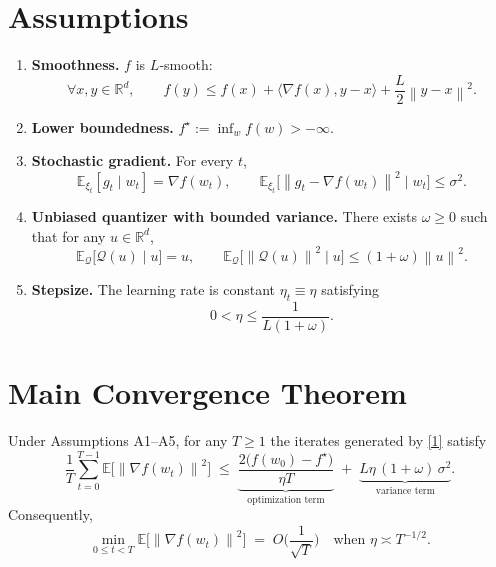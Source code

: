 \documentclass{article}
\newcommand{\E}{\mathbb{E}}
\newcommand{\R}{\mathbb{R}}
\newcommand{\norm}[1]{\left\lVert #1\right\rVert}
\newcommand{\ip}[2]{\langle #1,#2\rangle}
\newcommand{\Q}{\mathcal{Q}}
\newcommand{\grad}{\nabla}
\begin{document}
\newpage
\section*{Assumptions}
\begin{enumerate}[label={A\arabic*}.]
\item \textbf{Smoothness.} $f$ is $L$‑smooth:
\[
\forall x,y\in\R^d,\qquad
f(y)\le f(x)+\ip{\grad f(x)}{y-x}+\frac{L}{2}\norm{y-x}^2 .
\tag{A1}
\]
\item \textbf{Lower boundedness.} $f^{\star}:=\inf_{w}f(w)>-\infty$.
\item \textbf{Stochastic gradient.} For every $t$,
\[
\E_{\xi_t}[g_t\mid w_t]=\grad f(w_t),\qquad
\E_{\xi_t}\!\big[\norm{g_t-\grad f(w_t)}^2\mid w_t\big]\le\sigma^2 .
\tag{A3}
\]
\item \textbf{Unbiased quantizer with bounded variance.} There exists $\omega\ge0$ such that for any $u\in\R^d$,
\[
\E_{\Q}\!\big[\Q(u)\mid u\big]=u,\qquad
\E_{\Q}\!\big[\norm{\Q(u)}^2\mid u\big]\le (1+\omega)\norm{u}^2 .
\tag{A4}
\]
\item \textbf{Stepsize.} The learning rate is constant $\eta_t\equiv\eta$ satisfying
\[
0<\eta\le\frac{1}{L(1+\omega)} .
\tag{A5}
\]
\end{enumerate}

\section*{Main Convergence Theorem}
\begin{theorem}\label{thm:main}
Under Assumptions A1–A5, for any $T\ge1$ the iterates generated by \eqref{1} satisfy
\[
\frac{1}{T}\sum_{t=0}^{T-1}\E\!\big[\norm{\grad f(w_t)}^2\big]
\;\le\;
\underbrace{\frac{2\big(f(w_0)-f^{\star}\big)}{\eta T}}_{\text{optimization term}}
\;+\;
\underbrace{L\eta\,(1+\omega)\,\sigma^2}_{\text{variance term}} .
\tag{2}
\]
Consequently,
\[
\min_{0\le t<T}\E\!\big[\norm{\grad f(w_t)}^2\big]\;=\;O\!\Big(\frac{1}{\sqrt{T}}\Big)
\quad\text{when }\eta\asymp T^{-1/2}.
\]
\end{theorem}
\end{document}
